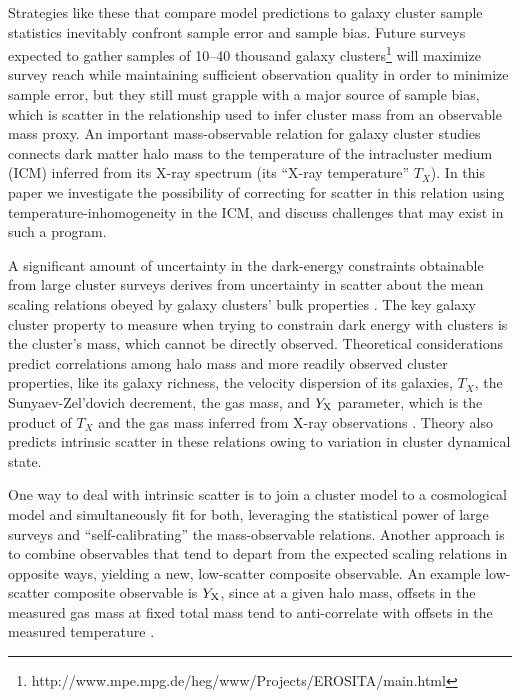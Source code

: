 \documentclass[12pt,preprint]{aastex}
\begin{document}
Strategies like these that compare model predictions to galaxy cluster
sample statistics inevitably confront sample error and sample bias.
Future surveys expected to gather samples of 10--40 thousand galaxy
clusters\footnote{http://www.mpe.mpg.de/heg/www/Projects/EROSITA/main.html}
will maximize survey reach while maintaining sufficient observation
quality in order to minimize sample error, but they still must grapple
with a major source of sample bias, which is scatter in the
relationship used to infer cluster mass from an observable mass proxy.
An important mass-observable relation for galaxy cluster studies
connects dark matter halo mass to the temperature of the intracluster
medium (ICM) inferred from its X-ray spectrum (its ``X-ray
temperature'' $T_X$).  In this paper we investigate the possibility of
correcting for scatter in this relation using
temperature-inhomogeneity in the ICM, and discuss challenges that may
exist in such a program.

A significant amount of uncertainty in the dark-energy constraints
obtainable from large cluster surveys derives from uncertainty in
scatter about the mean scaling relations obeyed by galaxy clusters'
bulk properties
\citep{lima_self-calibration_2005,2010PhRvD..81h3509C}.  The key
galaxy cluster property to measure when trying to constrain dark
energy with clusters is the cluster's mass, which cannot be directly
observed.  Theoretical considerations predict correlations among halo
mass and more readily observed cluster properties, like its galaxy
richness, the velocity dispersion of its galaxies, $T_X$, the
Sunyaev-Zel'dovich decrement, the gas mass, and $Y_{\rm X}$ parameter,
which is the product of $T_X$ and the gas mass inferred from X-ray
observations \citep{kravtsov_new_2006}.  Theory also predicts
intrinsic scatter in these relations owing to variation in cluster
dynamical state.

One way to deal with intrinsic scatter is to join a cluster model to a
cosmological model and simultaneously fit for both, leveraging the
statistical power of large surveys and ``self-calibrating'' the
mass-observable relations.  Another approach is to combine observables
that tend to depart from the expected scaling relations in opposite
ways, yielding a new, low-scatter composite observable.  An example
low-scatter composite observable is $Y_{\rm X}$, since at a given halo
mass, offsets in the measured gas mass at fixed total mass tend to
anti-correlate with offsets in the measured temperature
\citep{kravtsov_new_2006}.
\end{document}
